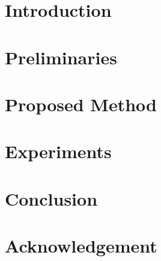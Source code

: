 \documentclass[10pt]{jarticle}
\begin{document}
    

    \maketitle

    

    \section{Introduction}\label{sec:Introduction}
    

    \section{Preliminaries}\label{sec:Preliminaries}
    

    \section{Proposed Method}\label{sec:ProposedMethod}
    


    \section{Experiments}\label{sec:Experiments}
    

    \section{Conclusion}\label{sec:Conclusion}
    


    \section*{Acknowledgement}\label{sec:Acknowledgement}
    

    \begin{spacing}{0.99}
        \small
        \setlength{\itemsep}{0pt}
        
        
    \end{spacing}
\end{document}
